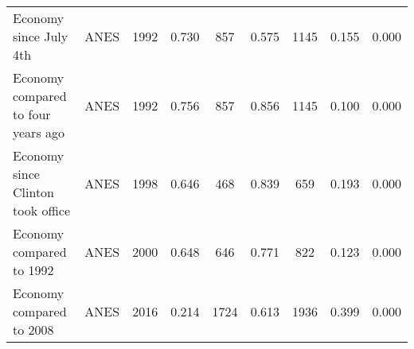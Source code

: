 \begin{table}[!htb]
\begin{tabular}{lllcccccc}
  Economy since July 4th & ANES & 1992 & 0.730 &  857 & 0.575 & 1145 & 0.155 & 0.000 \\ 
  Economy compared to four years ago & ANES & 1992 & 0.756 &  857 & 0.856 & 1145 & 0.100 & 0.000 \\ 
  Economy since Clinton took office & ANES & 1998 & 0.646 &  468 & 0.839 &  659 & 0.193 & 0.000 \\ 
  Economy compared to 1992 & ANES & 2000 & 0.648 &  646 & 0.771 &  822 & 0.123 & 0.000 \\ 
  Economy compared to 2008 & ANES & 2016 & 0.214 & 1724 & 0.613 & 1936 & 0.399 & 0.000 \\ 
   \hline
\end{tabular}
\endgroup
\end{table}
